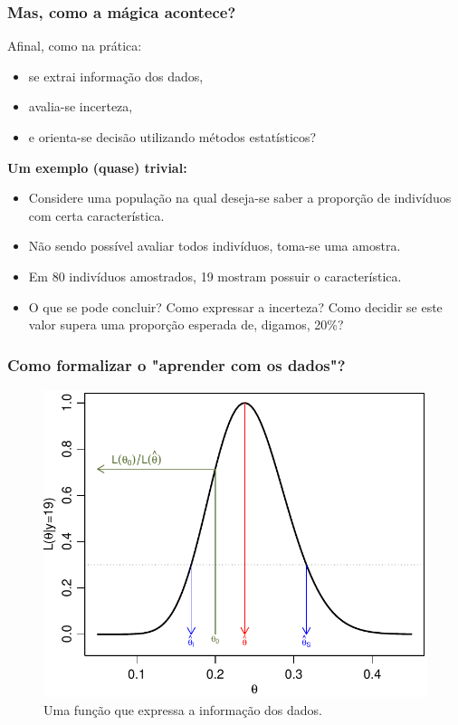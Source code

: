 \documentclass[handout,serif, professionalfont, usenames, dvipsnames, aspectratio = 169]{beamer}\usepackage[]{graphicx}\usepackage[]{color}
\begin{document}
\begin{frame}
\frametitle{Mas, como a mágica acontece?}

Afinal, como na prática:
  \begin{itemize}
  \item se extrai informação dos dados,
  \item avalia-se  incerteza, 
  \item e orienta-se decisão utilizando métodos estatísticos?
  \end{itemize}
  \pause
  \textbf{Um exemplo (quase) trivial:}
\begin{itemize}
\item Considere uma população na qual deseja-se saber a proporção de indivíduos com certa característica.
\item Não sendo possível avaliar todos indivíduos, toma-se uma amostra.
\item Em 80 indivíduos amostrados, 19 mostram possuir o característica.
\item O que se pode concluir? Como expressar a incerteza? Como decidir se este valor supera uma proporção esperada de, digamos, 20\%?    
\end{itemize}  
\end{frame}

\begin{frame}
\frametitle{Como formalizar o "aprender com os dados"?}

\centering
\begin{figure}
  \centering
  \includegraphics[height=0.45\textwidth]{pics/likelihood.pdf}
\caption{Uma função que expressa a informação dos dados.}
\end{figure}
\end{frame}



\end{document}
